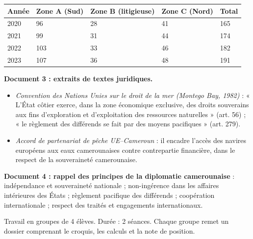 \documentclass[11pt]{article}
\newcounter{popsec}
\newcounter{popsub}
\newcommand{\courssub}[1]{%
  \stepcounter{popsub}%
  \par\vspace{9pt}\noindent{\popxbold\fontsize{11.5}{13}\selectfont\color{popink}{\color{poporange}\thepopsec.\thepopsub}\hspace{6pt}#1}\par\nopagebreak\vspace{4pt}
}
\begin{document}
\begin{center}
\begin{tabularx}{\linewidth}{|l|X|X|X|X|}
\hline
\rowcolor{popblueL} \textbf{Année} & \textbf{Zone A (Sud)} & \textbf{Zone B (litigieuse)} & \textbf{Zone C (Nord)} & \textbf{Total} \\
\hline
2020 & 96 & 28 & 41 & 165 \\
\hline
2021 & 99 & 31 & 44 & 174 \\
\hline
2022 & 103 & 33 & 46 & 182 \\
\hline
2023 & 107 & 36 & 48 & 191 \\
\hline
\end{tabularx}
\end{center}

\textbf{Document 3 : extraits de textes juridiques.}
\begin{itemize}
\item \emph{Convention des Nations Unies sur le droit de la mer (Montego Bay, 1982)} : « L'État côtier exerce, dans la zone économique exclusive, des droits souverains aux fins d'exploration et d'exploitation des ressources naturelles » (art. 56) ; « le règlement des différends se fait par des moyens pacifiques » (art. 279).
\item \emph{Accord de partenariat de pêche UE--Cameroun} : il encadre l'accès des navires européens aux eaux camerounaises contre contrepartie financière, dans le respect de la souveraineté camerounaise.
\end{itemize}

\textbf{Document 4 : rappel des principes de la diplomatie camerounaise} : indépendance et souveraineté nationale ; non-ingérence dans les affaires intérieures des États ; règlement pacifique des différends ; coopération internationale ; respect des traités et engagements internationaux.

\courssub{Consignes}

Travail en groupes de 4 élèves. Durée : 2 séances. Chaque groupe remet un dossier comprenant le croquis, les calculs et la note de position.
\end{document}
